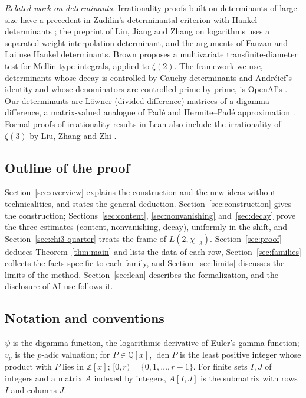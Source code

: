 \documentclass[11pt]{amsart}
\theoremstyle{definition}
\theoremstyle{remark}
\numberwithin{equation}{section}
\newcommand{\Z}{\mathbb Z}
\newcommand{\Q}{\mathbb Q}
\newcommand{\den}{\operatorname{den}}
\begin{document}
\emph{Related work on determinants.} Irrationality proofs built on determinants of large size have a precedent
in Zudilin's determinantal criterion with Hankel determinants \cite{Zudilin}; the preprint of Liu, Jiang
and Zhang on logarithms \cite{LiuJiangZhang26} uses a separated-weight interpolation determinant, and the arguments of
Fauzan and Lai \cite{Fauzan2026,Lai2026} use Hankel determinants. Brown \cite{Brown26} proposes a multivariate
transfinite-diameter test for Mellin-type integrals, applied to $\zeta(2)$. The framework
we use, determinants whose decay is controlled by Cauchy determinants and Andr\'eief's identity and whose
denominators are controlled prime by prime, is OpenAI's \cite{OpenAI2026}. Our determinants are L\"owner
(divided-difference) matrices of a digamma difference, a matrix-valued analogue of Pad\'e and Hermite--Pad\'e
approximation \cite{NikishinSorokin91}. Formal proofs of irrationality results in Lean also include the
irrationality of $\zeta(3)$ by Liu, Zhang and Zhi \cite{LZZ25}.

\subsection{Outline of the proof}
Section~\ref{sec:overview} explains the construction and the new ideas without technicalities, and states the
general deduction. Section~\ref{sec:construction} gives the construction; Sections~\ref{sec:content},
\ref{sec:nonvanishing} and~\ref{sec:decay} prove the three estimates (content, nonvanishing, decay), uniformly in the
shift, and Section~\ref{sec:chi3-quarter} treats the frame of $L(2,\chi_{-3})$. Section~\ref{sec:proof} deduces
Theorem~\ref{thm:main} and lists the data of each row, Section~\ref{sec:families} collects the facts specific to each
family, and Section~\ref{sec:limits} discusses the limits of the method. Section~\ref{sec:lean} describes the
formalization, and the disclosure of AI use follows it.

\subsection{Notation and conventions}
$\psi$ is the digamma function, the logarithmic derivative of Euler's gamma function; $v_p$ is the $p$-adic valuation; for $P\in\Q[x]$,
$\den P$ is the least positive integer whose product with $P$ lies in $\Z[x]$; $[0,r)=\{0,1,\dots,r-1\}$. For finite sets $I,J$ of integers and a matrix $A$
indexed by integers, $A[I,J]$ is the submatrix with rows $I$ and columns $J$.
\end{document}
